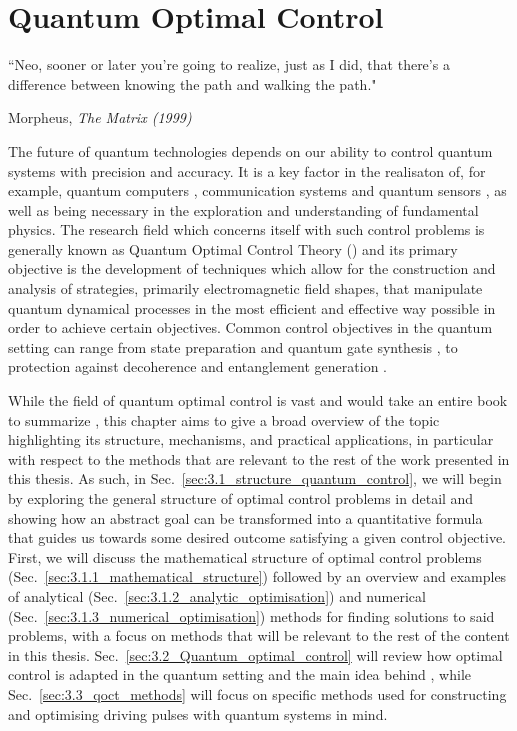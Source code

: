 \chapter{Quantum Optimal Control}\label{chap:3_Quantum_Optimal_control}
\epigraph{``Neo, sooner or later you’re going to realize, just as I did, that there’s a difference between knowing the path and walking the path."}{Morpheus, \emph{The Matrix (1999)}}

The future of quantum technologies depends on our ability to control quantum systems with precision and accuracy. It is a key factor in the realisaton of, for example, quantum computers \cite{ball_software_2021}, communication systems \cite{omran_generation_2019} and quantum sensors \cite{le_robust_2021}, as well as being necessary in the exploration and understanding of fundamental physics. The research field which concerns itself with such control problems is generally known as Quantum Optimal Control Theory () \cite{koch_quantum_2022,glaser_training_2015} and its primary objective is the development of techniques which allow for the construction and analysis of strategies, primarily electromagnetic field shapes, that manipulate quantum dynamical processes in the most efficient and effective way possible in order to achieve certain objectives. Common control objectives in the quantum setting can range from state preparation \cite{zhang_when_2019} and quantum gate synthesis \cite{pelegri_high-fidelity_2022}, to protection against decoherence \cite{rooney_decoherence_2012} and entanglement generation \cite{omran_generation_2019}.

While the field of quantum optimal control is vast and would take an entire book to summarize \cite{dalessio_quantum_2016}, this chapter aims to give a broad overview of the topic highlighting its structure, mechanisms, and practical applications, in particular with respect to the methods that are relevant to the rest of the work presented in this thesis. As such, in Sec.~\ref{sec:3.1_structure_quantum_control}, we will begin by exploring the general structure of optimal control problems in detail and showing how an abstract goal can be transformed into a quantitative formula that guides us towards some desired outcome satisfying a given control objective. First, we will discuss the mathematical structure of optimal control problems (Sec.~\ref{sec:3.1.1_mathematical_structure}) followed by an overview and examples of analytical (Sec.~\ref{sec:3.1.2_analytic_optimisation}) and numerical (Sec.~\ref{sec:3.1.3_numerical_optimisation}) methods for finding solutions to said problems, with a focus on methods that will be relevant to the rest of the content in this thesis. Sec.~\ref{sec:3.2_Quantum_optimal_control} will review how optimal control is adapted in the quantum setting and the main idea behind , while Sec.~\ref{sec:3.3_qoct_methods} will focus on specific methods used for constructing and optimising driving pulses with quantum systems in mind.

